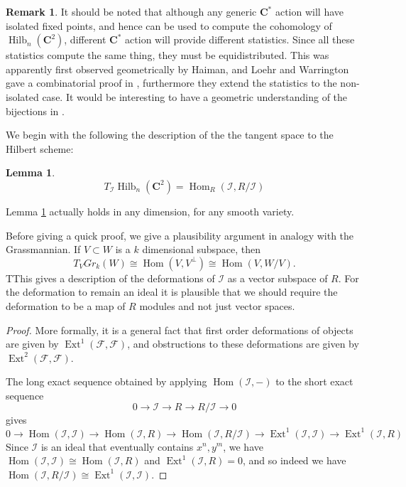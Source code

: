 \documentclass{amsart}[12pt]
\theoremstyle{definition}
\newtheorem{lemma}[dummy]{Lemma}
\newtheorem{remark}[dummy]{Remark}
\newcommand{\C}{\mathbf{C}}
\DeclareMathOperator{\Hilb}{Hilb}
\DeclareMathOperator{\Ext}{Ext}
\DeclareMathOperator{\Hom}{Hom}
\begin{document}
\begin{remark}
It should be noted that although any generic $\C^*$ action will have isolated fixed points, and hence can be used to compute the cohomology of $\Hilb_n(\C^2)$, different $\C^*$ action will provide different statistics.  Since all these statistics compute the same thing, they must be equidistributed.  This was apparently first observed geometrically by Haiman, and Loehr and Warrington gave a combinatorial proof in \cite{LW}, furthermore they extend the statistics to the non-isolated case.  It would be interesting to have a geometric understanding of the bijections in \cite{LW}.
\end{remark}



We begin with the following the description of the the tangent space to the Hilbert scheme:


\begin{lemma} \label{lem:tangent-hom}
$$T_{\mathcal{I}}\Hilb_n(\C^2)=\Hom_R(\mathcal{I},R/\mathcal{I})$$
\end{lemma}

Lemma \ref{lem:tangent-hom} actually holds in any dimension, for any smooth variety.

Before giving a quick proof, we give a plausibility argument in analogy with the Grassmannian.  If $V\subset W$ is a $k$ dimensional subspace, then 
$$T_V Gr_k(W)\cong \Hom(V, V^\perp) \cong \Hom(V, W/V).$$
TThis gives a description of the deformations of $\mathcal{I}$ as a vector subspace of $R$.  For the deformation to remain an ideal it is plausible that we should require the deformation to be a map of $R$ modules and not just vector spaces.

\begin{proof}
More formally, it is a general fact that first order deformations of objects are given by $\Ext^1(\mathcal{F},\mathcal{F})$, and obstructions to these deformations are given by $\Ext^2(\mathcal{F},\mathcal{F})$. 

The long exact sequence obtained by applying $\Hom(\mathcal{I}, -)$ to the short exact sequence
$$0\to \mathcal{I}\to R\to R/\mathcal{I}\to 0$$
gives 
$$0\to\Hom(\mathcal{I},\mathcal{I})\to \Hom(\mathcal{I}, R)\to\Hom(\mathcal{I},R/\mathcal{I})\to\Ext^1(\mathcal{I}, \mathcal{I})\to\Ext^1(\mathcal{I},R)$$
Since $\mathcal{I}$ is an ideal that eventually contains $x^n, y^m$, we have $\Hom(\mathcal{I},\mathcal{I})\cong\Hom(\mathcal{I}, R)$ and $\Ext^1(\mathcal{I},R)=0$, and so indeed we have $\Hom(\mathcal{I},R/\mathcal{I})\cong\Ext^1(\mathcal{I}, \mathcal{I})$.
\end{proof}
\end{document}
